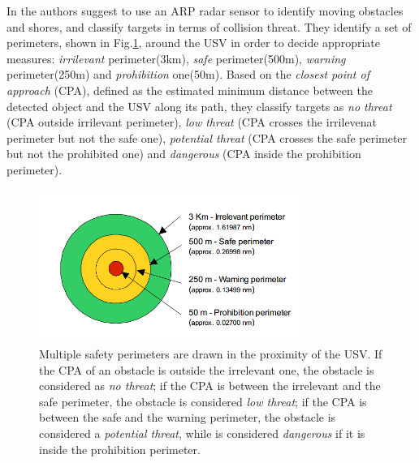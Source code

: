 \documentclass[12pt]{article}
\begin{document}
      \indent In \parencite{Almeida2009} the authors suggest to use an ARP radar sensor to identify moving obstacles and shores, and classify targets in terms of collision threat. They identify a set of perimeters, shown in Fig.\ref{fig:perimeters}, around the USV in order to decide appropriate measures: \textit{irrilevant} perimeter(3km), \textit{safe} perimeter(500m), \textit{warning} perimeter(250m) and \textit{prohibition} one(50m). Based on the \textit{closest point of approach} (CPA), defined as the estimated minimum distance between the detected object and the USV along its path, they classify targets as \textit{no threat} (CPA outside irrilevant perimeter), \textit{low threat} (CPA crosses the irrilevenat perimeter but not the safe one), \textit{potential threat} (CPA crosses the safe perimeter but not the prohibited one) and \textit{dangerous} (CPA inside the prohibition perimeter).

      \begin{figure}
            \centering
            \includegraphics[height=5cm]{./Images/Almeida/perimeters}
            \caption{Multiple safety perimeters are drawn in the proximity of the USV. If the CPA of an obstacle is outside the irrelevant one, the obstacle is considered as \textit{no threat}; if the CPA is between the irrelevant and the safe perimeter, the obstacle is considered \textit{low threat}; if the CPA is between the safe and the warning perimeter, the obstacle is considered a \textit{potential threat}, while is considered \textit{dangerous} if it is inside the prohibition perimeter.}
            \label{fig:perimeters}
      \end{figure}
\end{document}
